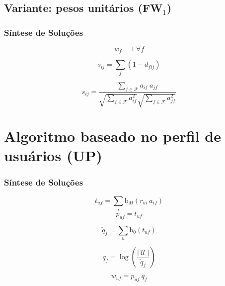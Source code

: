 \subsection{Variante: pesos unitários (FW$_1$)} %
\label{sub:variante_pesos_unit_rios}

\begin{frame}
\frametitle{Síntese de Soluções}
\begin{equation}
w_f = 1~\forall f
\end{equation} 

\begin{equation} 
\label{eq:sij1}
    s_{ij} = \sum_{f}{\left(1-d_{fij}\right)}
\end{equation}

\begin{equation} 
\label{eq:scos}
    s_{ij} = \frac{\sum\limits_{f \in \mathcal{F}}{a_{if}~a_{jf}}}{\sqrt{\sum\limits_{f \in \mathcal{F}}a_{if}^2} \sqrt{\sum\limits_{f \in \mathcal{F}}a_{jf}^2}}
\end{equation}
\end{frame}


\section{Algoritmo baseado no perfil de usuários (UP)} %
\label{sec:algoritmo_baseado_no_perfil_de_usu_rios_}


\begin{frame}
\frametitle{Síntese de Soluções}

\begin{equation}
\label{eq:puf} 
    t_{uf} = \sum_{i}{\mathrm{b}_M\left(r_{ui}~a_{if}\right)} 
\end{equation} 
\begin{equation}
\label{eq:tf} 
    p_{uf} = t_{uf}
\end{equation} 

\begin{equation}
\label{eq:uf} 
    \check{q}_{f} = \sum_{u}{\mathrm{b}_0\left(t_{uf}\right)}
\end{equation} 

\begin{equation}
\label{eq:iuf} 
    q_{f} = \log \left( \frac{\left|~\mathcal{U}~\right|}{\check{q}_{f}} \right)
\end{equation} 


\begin{equation}
\label{eq:w-tfidf} 
    w_{uf} = p_{uf}~q_{f}
\end{equation} 

\end{frame}


